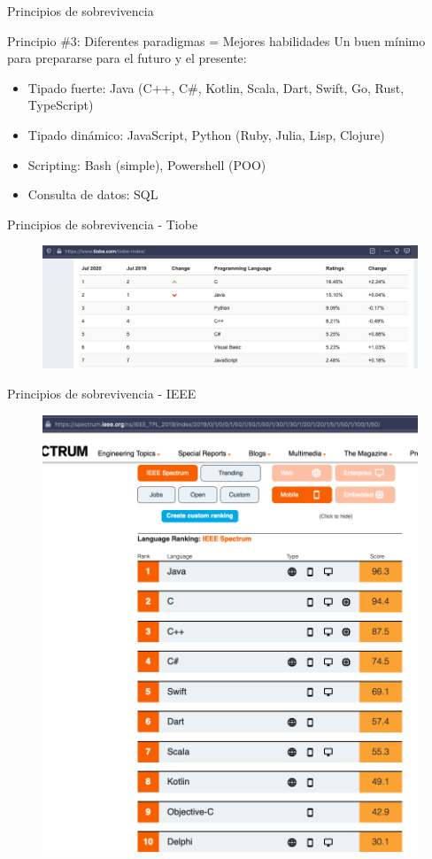 \documentclass[aspectratio=169]{beamer}
\begin{document}
\begin{frame}{Principios de sobrevivencia}

	\begin{exampleblock}{Principio \#3: Diferentes paradigmas = Mejores habilidades}
    Un buen mínimo para prepararse para el futuro y el presente:
    \begin{itemize}
    	\item Tipado fuerte: Java (C++, C\#, Kotlin, Scala, Dart, Swift, Go, Rust, TypeScript)
        \item Tipado dinámico: JavaScript, Python (Ruby, Julia, Lisp, Clojure)
        \item Scripting: Bash (simple), Powershell (POO)
        \item Consulta de datos: SQL
   	\end{itemize}

	\end{exampleblock}
\end{frame}

\begin{frame}{Principios de sobrevivencia - Tiobe}
	\begin{figure}
		\centering
		\includegraphics[width=0.9\linewidth]{Images/tiobe}
	\end{figure}
\end{frame}

\begin{frame}{Principios de sobrevivencia - IEEE}
    \begin{figure}
        \centering
        \includegraphics[width=0.5\linewidth]{Images/ieeemobile}
    \end{figure}
\end{frame}
\end{document}
